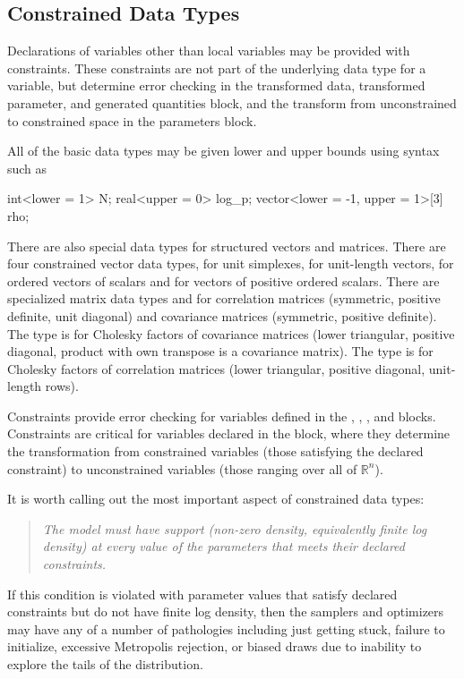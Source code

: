 \subsection{Constrained Data Types}

Declarations of variables other than local variables may be provided
with constraints.  These constraints are not part of the underlying
data type for a variable, but determine error checking in the
transformed data, transformed parameter, and generated quantities
block, and the transform from unconstrained to constrained space in
the parameters block.

All of the basic data types may be given lower and upper bounds using
syntax such as
%
\begin{stancode}
int<lower = 1> N;
real<upper = 0> log_p;
vector<lower = -1, upper = 1>[3] rho;
\end{stancode}

There are also special data types for structured vectors and
matrices. There are four constrained vector data types, 
for unit simplexes,  for unit-length vectors,
 for ordered vectors of scalars and
 for vectors of positive ordered
scalars. There are specialized matrix data types 
and  for correlation matrices (symmetric, positive
definite, unit diagonal) and covariance matrices (symmetric, positive
definite).  The type  is for Cholesky
factors of covariance matrices (lower triangular, positive diagonal,
product with own transpose is a covariance matrix).  The type
 is for Cholesky factors of correlation
matrices (lower triangular, positive diagonal, unit-length rows).

Constraints provide error checking for variables defined in the
, , ,
and  blocks.  Constraints are critical for
variables declared in the  block, where they
determine the transformation from constrained variables (those
satisfying the declared constraint) to unconstrained variables (those
ranging over all of $\mathbb{R}^n$).

It is worth calling out the most important aspect of constrained data
types:
%
\begin{quote}
  \it The model must have support (non-zero density, equivalently
  finite log density) at every value of the parameters that meets
  their declared constraints.
\end{quote}
%
If this condition is violated with parameter values that satisfy
declared constraints but do not have finite log density, then the
samplers and optimizers may have any of a number of pathologies
including just getting stuck, failure to initialize, excessive
Metropolis rejection, or biased draws due to inability to explore
the tails of the distribution.


